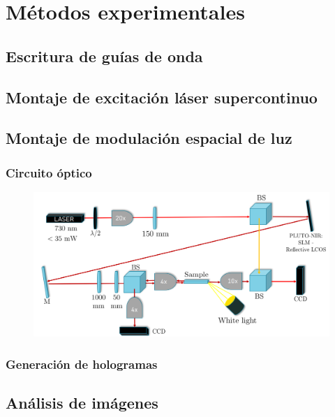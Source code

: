 \chapter{Métodos experimentales}

\section{Escritura de guías de onda}

\section{Montaje de excitación láser supercontinuo}

\section{Montaje de modulación espacial de luz}
\subsection{Circuito óptico}
\begin{figure}[H]
	\includegraphics[width=\linewidth]{media/SLMsetup}
\end{figure}
\subsection{Generación de hologramas}
\section{Análisis de imágenes}

